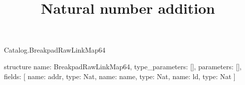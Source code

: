 \begin{lexlean}{Catalog.BreakpadRawLinkMap64}
\title{Natural number addition}
\begin{semanticmodule}
structure{
  name: BreakpadRawLinkMap64,
  type_parameters: [],
  parameters: [],
  fields: [
    {name: addr, type: Nat},
    {name: name, type: Nat},
    {name: ld, type: Nat}
  ]
}
\end{semanticmodule}
\end{lexlean}
